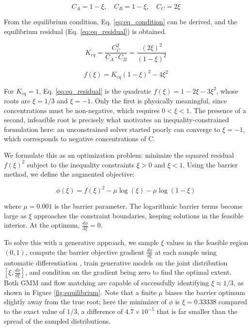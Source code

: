 \documentclass{achemso}
\begin{document}
\begin{equation} \label{eq:equilibrium_eq}
C_A = 1 - \xi, \quad C_B = 1 - \xi, \quad C_C = 2\xi
\end{equation}

From the equilibrium condition, Eq. \ref{eq:eq_condition} can be derived, and the equilibrium residual (Eq. \ref{eq:eq_residual}) is obtained.

\begin{equation} \label{eq:eq_condition}
K_{eq} = \frac{C_C^2}{C_A \cdot C_B} = \frac{(2\xi)^2}{(1-\xi)^2}
\end{equation}

\begin{equation} \label{eq:eq_residual}
f(\xi) = K_{eq}(1-\xi)^2 - 4\xi^2
\end{equation}

For \(K_{eq} = 1\), Eq. \ref{eq:eq_residual} is the quadratic \(f(\xi) = 1 - 2\xi - 3\xi^2\), whose roots are \(\xi = 1/3\) and \(\xi = -1\). Only the first is physically meaningful, since concentrations must be non-negative, which requires \(0 < \xi < 1\). The presence of a second, infeasible root is precisely what motivates an inequality-constrained formulation here: an unconstrained solver started poorly can converge to \(\xi = -1\), which corresponds to negative concentrations of C.

We formulate this as an optimization problem: minimize the squared residual \(f(\xi)^2\) subject to the inequality constraints \(\xi > 0\) and \(\xi < 1\). Using the barrier method, we define the augmented objective:

\begin{equation}
\phi(\xi) = f(\xi)^2 - \mu \log(\xi) - \mu \log(1-\xi)
\end{equation}

\noindent where \(\mu = 0.001\) is the barrier parameter. The logarithmic barrier terms become large as \(\xi\) approaches the constraint boundaries, keeping solutions in the feasible interior. At the optimum, \(\frac{d\phi}{d\xi} = 0\).

To solve this with a generative approach, we sample \(\xi\) values in the feasible region \((0, 1)\), compute the barrier objective gradient \(\frac{d\phi}{d\xi}\) at each sample using automatic differentiation \cite{jax2018github}, train generative models on the joint distribution \([\xi, \frac{d\phi}{d\xi}]\), and condition on the gradient being zero to find the optimal extent. Both GMM and flow matching are capable of successfully identifying \(\xi \approx 1/3\), as shown in Figure \ref{fig:equilibrium}. Note that a finite \(\mu\) biases the barrier optimum slightly away from the true root; here the minimizer of \(\phi\) is \(\xi = 0.33338\) compared to the exact value of \(1/3\), a difference of \(4.7 \times 10^{-5}\) that is far smaller than the spread of the sampled distributions.
\end{document}
